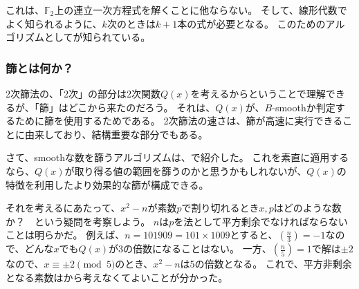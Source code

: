 これは、$\mathbb{F}_2$上の連立一次方程式を解くことに他ならない。
そして、線形代数でよく知られるように、$k$次のときは$k+1$本の式が必要となる。
このためのアルゴリズムとしてが知られている。

\subsubsection{篩とは何か？}
2次篩法の、「2次」の部分は2次関数$Q(x)$を考えるからということで理解できるが、「篩」はどこから来たのだろう。
それは、$Q(x)$が、$B$-smoothか判定するために篩を使用するためである。
2次篩法の速さは、篩が高速に実行できることに由来しており、結構重要な部分でもある。

さて、smoothな数を篩うアルゴリズムは、で紹介した。
これを素直に適用するなら、$Q(x)$が取り得る値の範囲を篩うのかと思うかもしれないが、$Q(x)$の特徴を利用したより効果的な篩が構成できる。

それを考えるにあたって、$x^2 - n$が素数$p$で割り切れるとき$x,p$はどのような数か？　という疑問を考察しよう。
$n$は$p$を法として平方剰余でなければならないことは明らかだ。
例えば、$n=101909=101\times1009$とすると、$\left(\frac{n}{3}\right)=-1$なので、どんな$x$でも$Q(x)$が3の倍数になることはない。
一方、$\left(\frac{n}{5}\right)=1$で解は$\pm2$なので、$x \equiv \pm2 \pmod{5}$のとき、$x^2 - n$は5の倍数となる。
これで、平方非剰余となる素数はから考えなくてよいことが分かった。

